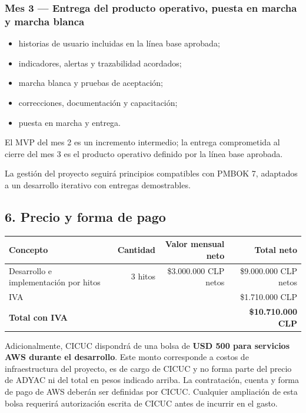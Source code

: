 \documentclass[
]{article}
\providecommand{\tightlist}{%
  \setlength{\itemsep}{0pt}\setlength{\parskip}{0pt}}
\begin{document}
\hypertarget{mes-3--entrega-del-producto-operativo-puesta-en-marcha-y-marcha-blanca}{%
\subsubsection{Mes 3 --- Entrega del producto operativo, puesta en
marcha y marcha
blanca}\label{mes-3--entrega-del-producto-operativo-puesta-en-marcha-y-marcha-blanca}}

\begin{itemize}
\tightlist
\item
  historias de usuario incluidas en la línea base aprobada;
\item
  indicadores, alertas y trazabilidad acordados;
\item
  marcha blanca y pruebas de aceptación;
\item
  correcciones, documentación y capacitación;
\item
  puesta en marcha y entrega.
\end{itemize}

El MVP del mes 2 es un incremento intermedio; la entrega comprometida al
cierre del mes 3 es el producto operativo definido por la línea base
aprobada.

La gestión del proyecto seguirá principios compatibles con PMBOK 7,
adaptados a un desarrollo iterativo con entregas demostrables.

\hypertarget{6-precio-y-forma-de-pago}{%
\subsection{6. Precio y forma de pago}\label{6-precio-y-forma-de-pago}}

\begin{longtable}[]{@{}lrrr@{}}
\toprule\noalign{}
Concepto & Cantidad & Valor mensual neto & Total neto \\
\midrule\noalign{}
\endhead
\bottomrule\noalign{}
\endlastfoot
Desarrollo e implementación por hitos & 3 hitos & \$3.000.000 CLP netos
& \$9.000.000 CLP netos \\
IVA & & & \$1.710.000 CLP \\
\textbf{Total con IVA} & & & \textbf{\$10.710.000 CLP} \\
\end{longtable}

Adicionalmente, CICUC dispondrá de una bolsa de \textbf{USD 500 para
servicios AWS durante el desarrollo}. Este monto corresponde a costos de
infraestructura del proyecto, es de cargo de CICUC y no forma parte del
precio de ADYAC ni del total en pesos indicado arriba. La contratación,
cuenta y forma de pago de AWS deberán ser definidas por CICUC. Cualquier
ampliación de esta bolsa requerirá autorización escrita de CICUC antes
de incurrir en el gasto.
\end{document}
